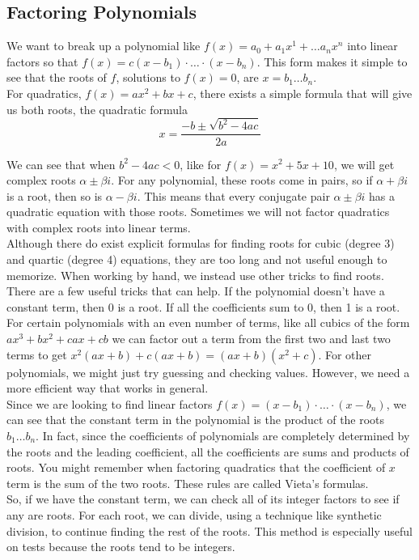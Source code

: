 \subsection{Factoring Polynomials}
\noindent
We want to break up a polynomial like $f(x) = a_0 + a_1x^1 + \ldots a_nx^n$ into linear factors so that $f(x) = c(x-b_1)\cdot \ldots \cdot(x - b_n)$. This form makes it simple to see that the roots of $f$, solutions to $f(x) = 0$, are $x = b_1 \ldots b_n$.\\

\noindent
For quadratics, $f(x) = ax^2 + bx + c$, there exists a simple formula that will give us both roots, the quadratic formula
\begin{equation*}
	x = \frac{-b \pm \sqrt{b^2-4ac}}{2a}
\end{equation*}

\noindent
We can see that when $b^2 - 4ac < 0$, like for $f(x) = x^2 + 5x + 10$, we will get complex roots $\alpha \pm \beta i$. For any polynomial, these roots come in pairs, so if $\alpha + \beta i$ is a root, then so is $\alpha - \beta i$. This means that every conjugate pair $\alpha \pm \beta i$ has a quadratic equation with those roots. Sometimes we will not factor quadratics with complex roots into linear terms.\\

\noindent
Although there do exist explicit formulas for finding roots for cubic (degree 3) and quartic (degree 4) equations, they are too long and not useful enough to memorize. When working by hand, we instead use other tricks to find roots.\\

\noindent
There are a few useful tricks that can help. If the polynomial doesn't have a constant term, then 0 is a root. If all the coefficients sum to 0, then 1 is a root. For certain polynomials with an even number of terms, like all cubics of the form $ax^3 + bx^2 + cax + cb$ we can factor out a term from the first two and last two terms to get $x^2(ax+b)+c(ax+b) = (ax+b)(x^2+c)$. For other polynomials, we might just try guessing and checking values. However, we need a more efficient way that works in general.\\

\noindent
Since we are looking to find linear factors $f(x) = (x-b_1)\cdot \ldots \cdot(x-b_n)$, we can see that the constant term in the polynomial is the product of the roots $b_1 \ldots b_n$. In fact, since the coefficients of polynomials are completely determined by the roots and the leading coefficient, all the coefficients are sums and products of roots. You might remember when factoring quadratics that the coefficient of $x$ term is the sum of the two roots. These rules are called Vieta's formulas.\\

\noindent
So, if we have the constant term, we can check all of its integer factors to see if any are roots. For each root, we can divide, using a technique like synthetic division, to continue finding the rest of the roots. This method is especially useful on tests because the roots tend to be integers.

